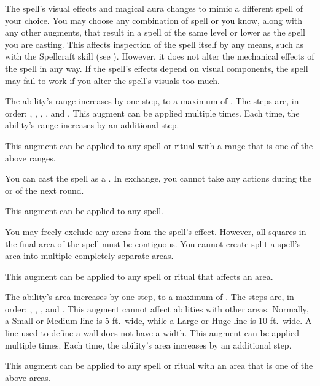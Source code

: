              The spell's visual effects and magical aura changes to mimic a different spell of your choice.
            You may choose any combination of spell or  you know, along with any other augments, that result in a spell of the same level or lower as the spell you are casting.
            This affects inspection of the spell itself by any means, such as with the Spellcraft skill (see ).
            However, it does not alter the mechanical effects of the spell in any way.
            If the spell's effects depend on visual components, the spell may fail to work if you alter the spell's visuals too much. 

             The ability's range increases by one step, to a maximum of \rngext.
            The steps are, in order: \rngtouch, \rngclose, \rngmed, \rnglong, and \rngext.
            This augment can be applied multiple times.
            Each time, the ability's range increases by an additional step.
            \par This augment can be applied to any spell or ritual with a range that is one of the above ranges.

             You can cast the spell as a .
            In exchange, you cannot take any actions during the  or  of the next round.
            \par This augment can be applied to any spell.

             You may freely exclude any areas from the spell's effect.
            However, all squares in the final area of the spell must be contiguous.
            You cannot create split a spell's area into multiple completely separate areas.
            \par This augment can be applied to any spell or ritual that affects an area.

             The ability's area increases by one step, to a maximum of \areahuge.
            The steps are, in order: \areasmall, \areamed, \arealarge, and \areahuge.
            This augment cannot affect abilities with other areas.
            Normally, a Small or Medium line is 5 ft.\ wide, while a Large or Huge line is 10 ft.\ wide.
            A line used to define a wall does not have a width.
            This augment can be applied multiple times.
            Each time, the ability's area increases by an additional step.
            \par This augment can be applied to any spell or ritual with an area that is one of the above areas.

